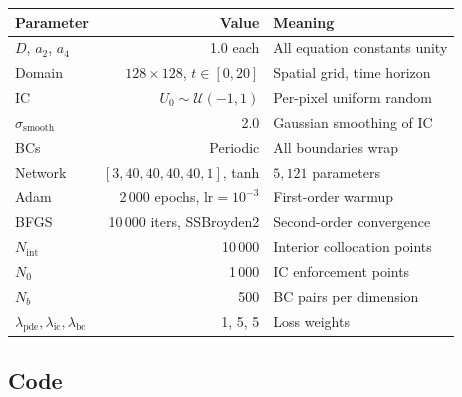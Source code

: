 \documentclass[11pt,a4paper]{article}
\begin{document}
\begin{center}
\begin{tabular}{lrl}
\toprule
\textbf{Parameter} & \textbf{Value} & \textbf{Meaning} \\
\midrule
$D$, $a_2$, $a_4$     & 1.0 each  & All equation constants unity \\
Domain                 & $128\times 128$, $t\in[0,20]$ & Spatial grid, time horizon \\
IC                     & $U_0 \sim \mathcal{U}(-1,1)$  & Per-pixel uniform random \\
$\sigma_{\mathrm{smooth}}$ & 2.0 & Gaussian smoothing of IC \\
BCs                    & Periodic  & All boundaries wrap \\
Network                & $[3,40,40,40,40,1]$, tanh & $5{,}121$ parameters \\
Adam                   & 2\,000 epochs, lr$=10^{-3}$ & First-order warmup \\
BFGS                   & 10\,000 iters, SSBroyden2    & Second-order convergence \\
$N_{\mathrm{int}}$     & 10\,000    & Interior collocation points \\
$N_0$                  & 1\,000     & IC enforcement points \\
$N_b$                  & 500        & BC pairs per dimension \\
$\lambda_{\mathrm{pde}},\lambda_{\mathrm{ic}},\lambda_{\mathrm{bc}}$ & 1, 5, 5 & Loss weights \\
\bottomrule
\end{tabular}
\end{center}

\subsection*{Code}
\end{document}
